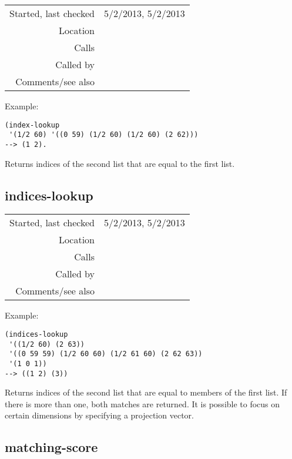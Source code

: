 \vspace{0.3cm}
\begin{tabular}{r|p{8cm}}
Started, last checked & 5/2/2013, 5/2/2013 \\
Location & \nameref{sec:robust-metrics} \\
Calls & \\
Called by & \nameref{fun:indices-lookup} \\
Comments/see also &
\end{tabular}

\vspace{0.5cm}
\noindent Example:
\begin{verbatim}
(index-lookup
 '(1/2 60) '((0 59) (1/2 60) (1/2 60) (2 62)))
--> (1 2).
\end{verbatim}

\noindent Returns indices of the second list that are
equal to the first list.


\subsection*{indices-lookup}\label{fun:indices-lookup}

\vspace{0.3cm}
\begin{tabular}{r|p{8cm}}
Started, last checked & 5/2/2013, 5/2/2013 \\
Location & \nameref{sec:robust-metrics} \\
Calls & \nameref{fun:index-lookup} \\
Called by & \nameref{fun:indices-lookup} \\
Comments/see also &
\end{tabular}

\vspace{0.5cm}
\noindent Example:
\begin{verbatim}
(indices-lookup
 '((1/2 60) (2 63))
 '((0 59 59) (1/2 60 60) (1/2 61 60) (2 62 63))
 '(1 0 1))
--> ((1 2) (3))
\end{verbatim}

\noindent Returns indices of the second list that are
equal to members of the first list. If there is more
than one, both matches are returned. It is possible to
focus on certain dimensions by specifying a projection
vector.


\subsection*{matching-score}\label{fun:matching-score}

